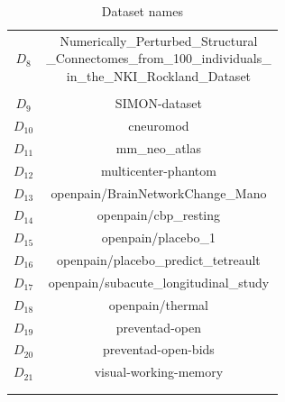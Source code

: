 \documentclass[conference]{IEEEtran}
\begin{document}
\begin{table}
\begin{tabular}{cc}
        $D_{8}$ & \parbox{3cm}{Numerically\_Perturbed\_Structural\\
                \_Connectomes\_from\_100\_individuals\_ \\in\_the\_NKI\_Rockland\_Dataset}\\[5pt]
                &\\
        $D_{9}$ & SIMON-dataset\\
        $D_{10}$ & cneuromod\\
        $D_{11}$ & mm\_neo\_atlas\\
        $D_{12}$ & multicenter-phantom\\
        $D_{13}$ & openpain/BrainNetworkChange\_Mano\\
        $D_{14}$ & openpain/cbp\_resting\\
        $D_{15}$ & openpain/placebo\_1\\
        $D_{16}$ & openpain/placebo\_predict\_tetreault\\
        $D_{17}$ & openpain/subacute\_longitudinal\_study\\
        $D_{18}$ & openpain/thermal\\
        $D_{19}$ & preventad-open\\
        $D_{20}$ & preventad-open-bids\\
        $D_{21}$ & visual-working-memory\\
        
        
        \hline \\
        &
    \end{tabular}
    \caption{Dataset names}
    \label{tab:data_names}
\end{table}
\end{document}
